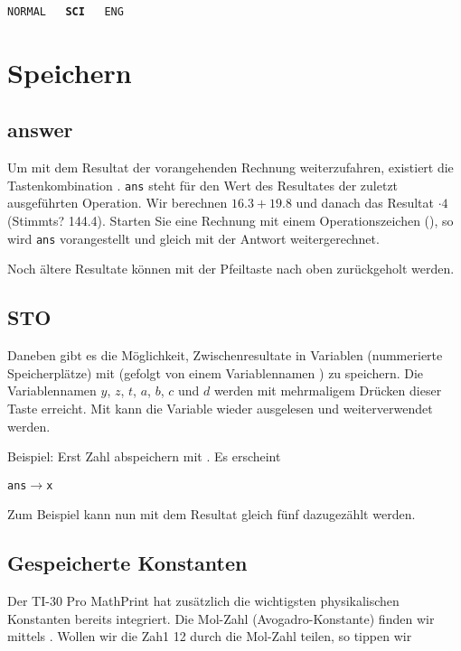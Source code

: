 \texttt{NORMAL\,\,\,\textbf{SCI}\,\,\,ENG}

\newpage


\section{Speichern}

\subsection{answer}\label{AnsSto}

Um mit dem Resultat der vorangehenden Rechnung weiterzufahren,
existiert die Tastenkombination . \texttt{ans} steht für den Wert des
Resultates der zuletzt ausgeführten Operation. Wir berechnen $16.3 +
19.8$ und danach das Resultat $\cdot4$ (Stimmts? 144.4). Starten Sie
eine Rechnung mit einem Operationszeichen (\zB {}), so
wird \texttt{ans} vorangestellt und gleich mit der Antwort weitergerechnet.

Noch ältere Resultate können mit der Pfeiltaste nach oben  zurückgeholt werden.

\subsection{STO}\label{sto}

Daneben gibt es die Möglichkeit, Zwischenresultate in Variablen (nummerierte
Speicherplätze) mit  (gefolgt von einem
Variablennamen ) zu
speichern. Die Variablennamen $y$, $z$, $t$, $a$, $b$, $c$ und $d$
werden mit mehrmaligem Drücken dieser Taste
erreicht. Mit  kann die Variable wieder 
ausgelesen und weiterverwendet werden.

Beispiel: Erst Zahl abspeichern mit  . Es
erscheint

\texttt{ans$\rightarrow{}$x}

Zum Beispiel kann nun
mit     
dem Resultat gleich fünf dazugezählt werden.

\subsection{Gespeicherte Konstanten}\label{constants}
Der TI-30 Pro MathPrint hat zusätzlich die wichtigsten physikalischen
Konstanten bereits integriert. Die Mol-Zahl (Avogadro-Konstante) \zB
finden wir mittels  . Wollen wir \zB die
Zah1 12 durch die Mol-Zahl teilen, so tippen wir

